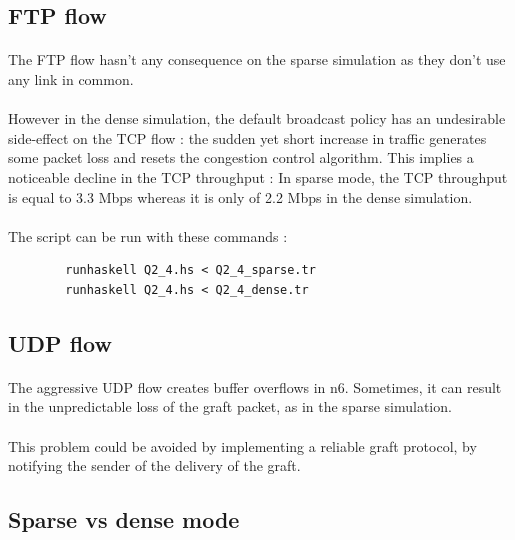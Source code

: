 \documentclass[a4paper]{article}
\begin{document}
  \subsection{FTP flow}

    \paragraph{}The FTP flow hasn't any consequence on the sparse simulation as
they don't use any link in common.

    \paragraph{}However in the dense simulation, the default broadcast policy
has an undesirable side-effect on the TCP flow : the sudden yet short increase
in traffic generates some packet loss and resets the congestion control
algorithm. This implies a noticeable decline in the TCP throughput :
\newline In sparse mode, the TCP throughput is equal to 3.3 Mbps whereas it is
only of 2.2 Mbps in the dense simulation.

    \paragraph{}The script can be run with these commands :
    \begin{verbatim}
        runhaskell Q2_4.hs < Q2_4_sparse.tr
        runhaskell Q2_4.hs < Q2_4_dense.tr
    \end{verbatim}

  \subsection{UDP flow}

    \paragraph{}The aggressive UDP flow creates buffer overflows in n6.
Sometimes, it can result in the unpredictable loss of the graft packet, as in
the sparse simulation.

    \paragraph{}This problem could be avoided by implementing a reliable
graft protocol, by notifying the sender of the delivery of the graft.

  \subsection{Sparse vs dense mode}
\end{document}
